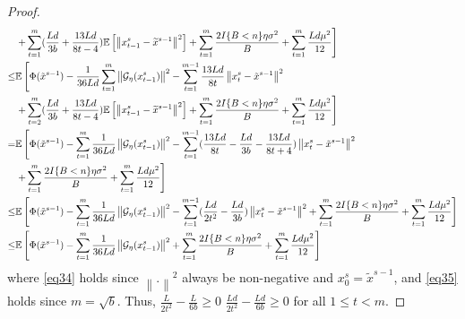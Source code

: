 \documentclass{article}
\newcommand*{\G}{\mathcal{G}}
\newcommand*{\E}{\mathbb{E}}
\newcommand{\norm}[1]{\left\lVert#1\right\rVert}
\theoremstyle{definition}
\theoremstyle{remark}
\begin{document}
\begin{proof}
{\begin{align}
&\left.+\sum_{t=1}^m(\frac{L d}{3b}+\frac{13Ld}{8t-4})\E\left[\norm{x_{t-1}^s-\widetilde{x}^{s-1}}^2\right]+ \sum_{t=1}^m\frac{2I\{B < n\}\eta \sigma ^2}{B}+ \sum_{t=1}^m\frac{L d \mu^2}{12}\right]\notag\\
\leq& \E\left[\Phi(\tilde{x}^{s-1}) - \frac{1}{36 Ld}\sum_{t=1}^m\norm{\G_{\eta}(x_{t-1}^s)}^2 -\sum_{t=1}^{m-1}\frac{13Ld}{8t}\norm{{x}_t^s-\tilde{x}^{s-1}}^2\right.\notag\\
&\left.+\sum_{t=2}^m(\frac{L d}{3b}+\frac{13Ld}{8t-4})\E\left[\norm{x_{t-1}^s-\widetilde{x}^{s-1}}^2\right]+ \sum_{t=1}^m\frac{2I\{B < n\}\eta \sigma ^2}{B}+\sum_{t=1}^m \frac{L d \mu^2}{12}\right]\label{eq34}\\
=& \E\left[\Phi(\tilde{x}^{s-1}) - \sum_{t=1}^m\frac{1}{36 Ld}\norm{\G_{\eta}(x_{t-1}^s)}^2 -\sum_{t=1}^{m-1}(\frac{13Ld}{8t}- \frac{Ld}{3b} - \frac{13Ld}{8t+4})\norm{{x}_t^s-\tilde{x}^{s-1}}^2\right.\\
&\left.+ \sum_{t=1}^m\frac{2I\{B < n\}\eta \sigma ^2}{B}+\sum_{t=1}^m \frac{L d \mu^2}{12}\right]\notag\\
\leq& \E\left[\Phi(\tilde{x}^{s-1}) - \sum_{t=1}^m\frac{1}{36 Ld}\norm{\G_{\eta}(x_{t-1}^s)}^2 -\sum_{t=1}^{m-1}(\frac{Ld}{2t^2}- \frac{Ld}{3b})\norm{{x}_t^s-\tilde{x}^{s-1}}^2+ \sum_{t=1}^m\frac{2I\{B < n\}\eta \sigma ^2}{B}+\sum_{t=1}^m \frac{L d \mu^2}{12}\right]\notag\\
\leq& \E\left[\Phi(\tilde{x}^{s-1}) - \sum_{t=1}^m\frac{1}{36 Ld}\norm{\G_{\eta}(x_{t-1}^s)}^2 + \sum_{t=1}^m\frac{2I\{B < n\}\eta \sigma ^2}{B}+\sum_{t=1}^m \frac{L d \mu^2}{12}\right]\label{eq35}
 \end{align}
 }
 where \eqref{eq34} holds since $\norm{.}^2$ always be non-negative and $x_0^s = \tilde{x}^{s-1}$, and \eqref{eq35} holds since $m = \sqrt{b}$. Thus, $\frac{L}{2t^2}- \frac{L}{6b}\geq 0$ {\color{blue} $\frac{Ld}{2t^2}- \frac{Ld}{6b}\geq 0$} for all $1\leq t < m$.
 

\end{proof}
\end{document}
